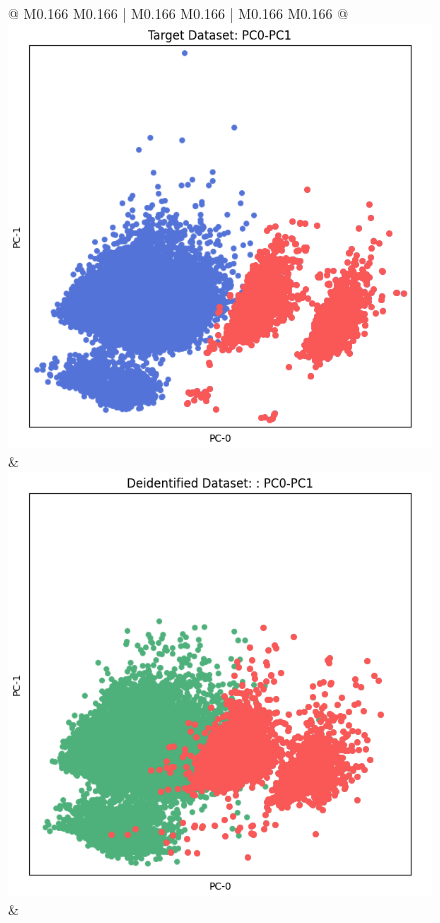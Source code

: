 \begin{figure}[p!]
\begin{tabular}{@{} M{0.166\textwidth} M{0.166\textwidth} | M{0.166\textwidth} M{0.166\textwidth} | M{0.166\textwidth} M{0.166\textwidth} @{}}
       \includegraphics[width=\linewidth]{z_AIM.orig.png} &
       \includegraphics[width=\linewidth]{z_AIM.syn.png} \\ 
 &

\end{tabular}
\end{figure}
